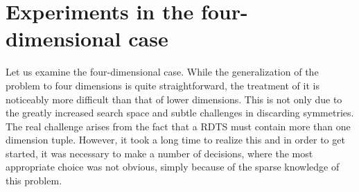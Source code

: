 \section{Experiments in the four-dimensional case}
\noindent Let us examine the four-dimensional case. While the generalization of the problem to four dimensions is quite straightforward, the treatment of it is noticeably more difficult than that of lower dimensions. This is not only due to the greatly increased search space and subtle challenges in discarding symmetries. The real challenge arises from the fact that a RDTS must contain more than one dimension tuple. However, it took a long time to realize this and in order to get started, it was necessary to make a number of decisions, where the most appropriate choice was not obvious, simply because of the sparse knowledge of this problem.

